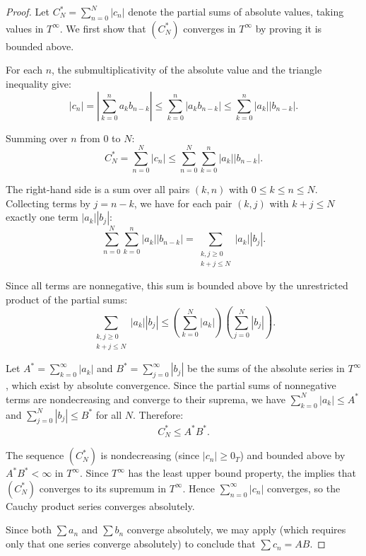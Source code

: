 \begin{proof}
    Let $C_N^* = \sum_{n=0}^N |c_n|$ denote the partial sums of absolute values, taking values in $T^\infty$. We first show that $(C_N^*)$ converges in $T^\infty$ by proving it is bounded above.

    For each $n$, the submultiplicativity of the absolute value and the triangle inequality give:
    $$|c_n| = \left|\sum_{k=0}^n a_k b_{n-k}\right| \leq \sum_{k=0}^n |a_k b_{n-k}| \leq \sum_{k=0}^n |a_k| |b_{n-k}|.$$

    Summing over $n$ from $0$ to $N$:
    $$C_N^* = \sum_{n=0}^N |c_n| \leq \sum_{n=0}^N \sum_{k=0}^n |a_k| |b_{n-k}|.$$

    The right-hand side is a sum over all pairs $(k, n)$ with $0 \leq k \leq n \leq N$. Collecting terms by $j = n - k$, we have for each pair $(k, j)$ with $k + j \leq N$ exactly one term $|a_k| |b_j|$:
    $$\sum_{n=0}^N \sum_{k=0}^n |a_k| |b_{n-k}| = \sum_{\substack{k, j \geq 0 \\ k + j \leq N}} |a_k| |b_j|.$$

    Since all terms are nonnegative, this sum is bounded above by the unrestricted product of the partial sums:
    $$\sum_{\substack{k, j \geq 0 \\ k + j \leq N}} |a_k| |b_j| \leq \left(\sum_{k=0}^N |a_k|\right) \left(\sum_{j=0}^N |b_j|\right).$$

    Let $A^* = \sum_{k=0}^\infty |a_k|$ and $B^* = \sum_{j=0}^\infty |b_j|$ be the sums of the absolute series in $T^\infty$, which exist by absolute convergence. Since the partial sums of nonnegative terms are nondecreasing and converge to their suprema, we have $\sum_{k=0}^N |a_k| \leq A^*$ and $\sum_{j=0}^N |b_j| \leq B^*$ for all $N$. Therefore:
    $$C_N^* \leq A^* B^*.$$

    The sequence $(C_N^*)$ is nondecreasing (since $|c_n| \geq 0_T$) and bounded above by $A^* B^* < \infty$ in $T^\infty$. Since $T^\infty$ has the least upper bound property, the  implies that $(C_N^*)$ converges to its supremum in $T^\infty$. Hence $\sum_{n=0}^\infty |c_n|$ converges, so the Cauchy product series converges absolutely.

    Since both $\sum a_n$ and $\sum b_n$ converge absolutely, we may apply  (which requires only that one series converge absolutely) to conclude that $\sum c_n = AB$.
\end{proof}

